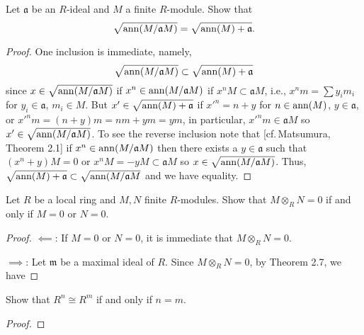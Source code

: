 \begin{problem}
Let $\mathfrak{a}$ be an $R$-ideal and $M$ a finite
$R$-module. Show that
\[
\sqrt{\operatorname{ann}(M/\mathfrak{a}M)}=\sqrt{\operatorname{ann}(M)+\mathfrak{a}}.
\]
\end{problem}
\begin{proof}
One inclusion is immediate, namely,
\[
\sqrt{\operatorname{ann}(M/\mathfrak{a}M)}\subset\sqrt{\operatorname{ann}(M)+\mathfrak{a}}
\]
since $x\in\sqrt{\operatorname{ann}(M/\mathfrak{a}M)}$ if
$x^n\in\operatorname{ann}(M/\mathfrak{a}M)$ if $x^nM\subset\mathfrak{a}M$,
i.e., $x^nm=\sum y_im_i$ for $y_i\in\mathfrak{a}$, $m_i\in
M$. But $x'\in\sqrt{\operatorname{ann}(M)+\mathfrak{a}}$ if $x'^n=n+y$ for
$n\in\operatorname{ann}(M)$, $y\in\mathfrak{a}$, or $x'^nm=(n+y)m=nm+ym=ym$, in
particular, $x'^nm\in\mathfrak{a}M$ so
$x'\in\sqrt{\operatorname{ann}(M/\mathfrak{a}M)}$. To see the reverse inclusion
note that [cf.\,Matsumura, Theorem 2.1] if
$x^n\in\operatorname{ann}(M/\mathfrak{a}M)$ then there exists a
$y\in\mathfrak{a}$ such that $(x^n+y)M=0$ or
$x^nM=-yM\subset\mathfrak{a}M$ so
$x\in\sqrt{\operatorname{ann}(M/\mathfrak{a}M)}$. Thus,
$\sqrt{\operatorname{ann}(M)+\mathfrak{a}}\subset\sqrt{\operatorname{ann}(M/\mathfrak{a}M}$
and we have equality.
\end{proof}
\newpage
\begin{problem}
Let $R$ be a local ring and $M,N$ finite $R$-modules. Show that
$M\otimes_R N=0$ if and only if $M=0$ or $N=0$.
\end{problem}
\begin{proof}
$\impliedby$: If $M=0$ or $N=0$, it is immediate that $M\otimes_R
N=0$.

$\implies$: Let $\mathfrak{m}$ be a maximal ideal of $R$. Since
$M\otimes_R N=0$, by Theorem 2.7, we have

\end{proof}
\newpage
\begin{problem}
Show that $R^n\cong R^m$ if and only if $n=m$.
\end{problem}
\begin{proof}
\end{proof}
